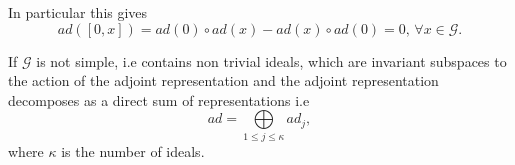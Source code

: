 \documentclass[aps,preprint]{revtex4}%
\begin{document}
In particular this gives
\begin{equation}
ad\left(  \left[  0,x\right]  \right)  =ad\left(  0\right)  \circ ad\left(
x\right)  -ad\left(  x\right)  \circ ad\left(  0\right)  =0,\,\forall
x\in\mathcal{G}.
\end{equation}


If $\mathcal{G}$ is not simple, i.e contains non trivial ideals, which are
invariant subspaces to the action of the adjoint representation and the
adjoint representation decomposes as a direct sum of representations i.e
\begin{equation}
ad=%
{\textstyle\bigoplus\limits_{1\leq j\leq\kappa}}
ad_{j},
\end{equation}
where $\kappa$ is the number of ideals.
\end{document}
